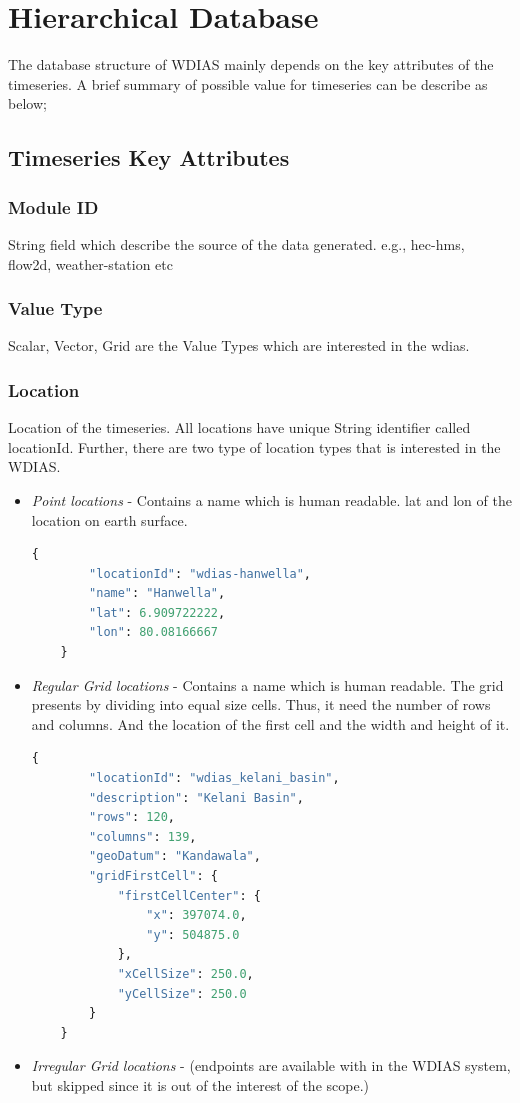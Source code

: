\section{Hierarchical Database}

The database structure of WDIAS mainly depends on the key attributes of the timeseries. A brief summary of possible value for timeseries can be describe as below;

\subsection{Timeseries Key Attributes}
\label{subse:timeseries_key_attributes}
\subsubsection{Module ID}
String field which describe the source of the data generated. e.g., hec-hms, flow2d, weather-station etc

\subsubsection{Value Type}
Scalar, Vector, Grid are the Value Types which are interested in the \acrshort{wdias}.

\subsubsection{Location}
Location of the timeseries. All locations have unique String identifier called locationId. Further, there are two type of location types that is interested in the WDIAS.
\begin{itemize}
  \item \emph{Point locations} - Contains a name which is human readable. lat and lon of the location on earth surface.
  \begin{lstlisting}[language=Python]
    {
        "locationId": "wdias-hanwella",
        "name": "Hanwella",
        "lat": 6.909722222,
        "lon": 80.08166667
    }
  \end{lstlisting}
  \item \emph{Regular Grid locations} - Contains a name which is human readable. The grid presents by dividing into equal size cells. Thus, it need the number of rows and columns. 
  And the location of the first cell and the width and height of it.
  \begin{lstlisting}[language=Python]
      {
        "locationId": "wdias_kelani_basin",
        "description": "Kelani Basin",
        "rows": 120,
        "columns": 139,
        "geoDatum": "Kandawala",
        "gridFirstCell": {
            "firstCellCenter": {
                "x": 397074.0,
                "y": 504875.0
            },
            "xCellSize": 250.0,
            "yCellSize": 250.0
        }
    }
  \end{lstlisting}
  \item \emph{Irregular Grid locations} - (endpoints are available with in the WDIAS system, but skipped since it is out of the interest of the scope.)
\end{itemize}

